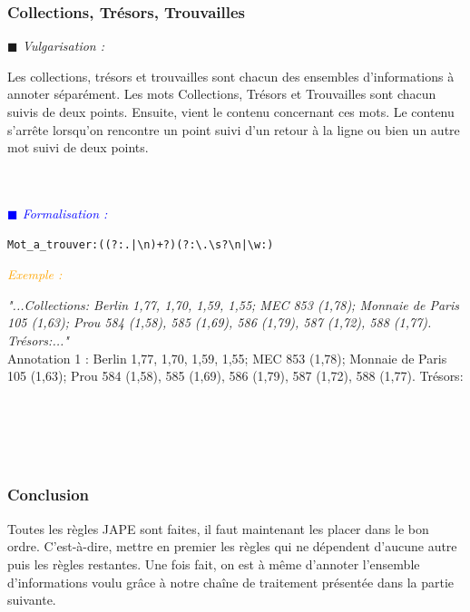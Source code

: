 \documentclass[a4paper, 11pt]{report}
\newenvironment{vulgarisation}
    {
    \textit{\textcolor{dark-blue}{$\blacksquare$  Vulgarisation : \\}}

    }
    {
    ~\\~\\
    }
\newenvironment{formalisation}
    {
    \textit{\textcolor{blue}{$\blacksquare$  Formalisation : \\}}
    }
    {
    ~\\~\\
    }
\newenvironment{exemple}
    {
    \textit{\textcolor{orange}{
    Exemple : \\}}
    }
    {
    ~\\
    }
\begin{document}
\subsubsection{Collections, Trésors, Trouvailles}
\begin{vulgarisation}
Les collections, trésors et trouvailles sont chacun des ensembles d'informations à annoter séparément.
    Les mots Collections, Trésors et Trouvailles sont chacun suivis de deux points. Ensuite, vient le contenu concernant ces mots. Le contenu s'arrête lorsqu'on rencontre un point suivi d'un retour à la ligne ou bien un autre mot suivi de deux points.
\end{vulgarisation}
\begin{formalisation}
    \begin{verbatim}
Mot_a_trouver:((?:.|\n)+?)(?:\.\s?\n|\w:)
    \end{verbatim}
    \begin{exemple}
        \emph{"...Collections: Berlin 1,77, 1,70, 1,59,
            1,55; MEC 853 (1,78); Monnaie de Paris 105 (1,63); Prou 584 (1,58), 585 (1,69), 586 (1,79), 587 
            (1,72), 588 (1,77). Trésors:..."}\\
        Annotation 1 :  Berlin 1,77, 1,70, 1,59,
        1,55; MEC 853 (1,78); Monnaie de Paris 105 (1,63); Prou 584 (1,58), 585 (1,69), 586 (1,79), 587 (1,72), 588 (1,77). Trésors:
    \end{exemple}
\end{formalisation}

\subsubsection*{Conclusion}
Toutes les règles JAPE sont faites, il faut maintenant les placer dans le bon ordre. C'est-à-dire, mettre en premier les règles qui ne dépendent d'aucune autre puis les règles restantes. Une fois fait, on est à même d'annoter l'ensemble d'informations voulu grâce à notre chaîne de traitement présentée dans la partie suivante.
\end{document}
